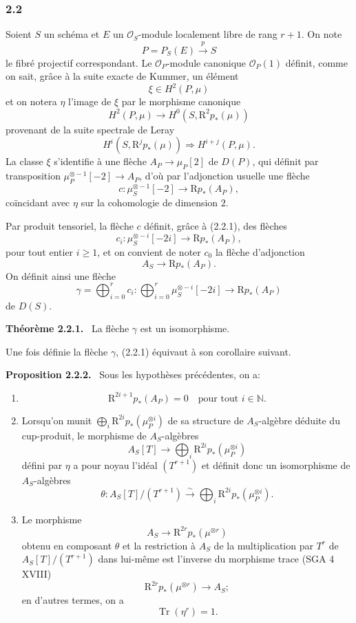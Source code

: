 \documentclass[11pt]{article}
\newenvironment{statement}[1]{\par\medskip\noindent\textbf{#1.}\ }{\par\medskip}
\newcommand{\R}{\mathrm{R}}\newcommand{\RHomCore}{\mathrm{RHom}}
\providecommand{\R}{\mathrm R}
\begin{document}
\subsubsection*{2.2}
Soient $S$ un schéma et $E$ un $\mathcal O_S$-module localement libre de rang $r+1$. On note
\[
P=P_S(E)\xrightarrow{p}S
\]
le fibré projectif correspondant. Le $\mathcal O_P$-module canonique $\mathcal O_P(1)$ définit, comme on sait, grâce à la suite exacte de Kummer, un élément
\[
\xi\in H^2(P,\mu)
\]
et on notera $\eta$ l'image de $\xi$ par le morphisme canonique
\[
H^2(P,\mu)\longrightarrow H^0(S,\R^2p_*(\mu))
\]
provenant de la suite spectrale de Leray
\[
H^i(S,\R^jp_*(\mu))\Rightarrow H^{i+j}(P,\mu).
\]
La classe $\xi$ s'identifie à une flèche $A_P\to\mu_P[2]$ de $D(P)$, qui définit par transposition $\mu_P^{\otimes -1}[-2]\to A_P$, d'où par l'adjonction usuelle une flèche
\[
c:\mu_S^{\otimes -1}[-2]\longrightarrow \R p_*(A_P),
\]
coïncidant avec $\eta$ sur la cohomologie de dimension $2$.

Par produit tensoriel, la flèche $c$ définit, grâce à (2.2.1), des flèches
\[
c_i:\mu_S^{\otimes -i}[-2i]\longrightarrow \R p_*(A_P),
\]
pour tout entier $i\ge1$, et on convient de noter $c_0$ la flèche d'adjonction
\[
A_S\longrightarrow \R p_*(A_P).
\]
On définit ainsi une flèche
\[
\gamma=\bigoplus_{i=0}^{r}c_i:
\bigoplus_{i=0}^{r}\mu_S^{\otimes -i}[-2i]\longrightarrow \R p_*(A_P)
\]
de $D(S)$.

\begin{statement}{Théorème 2.2.1}
La flèche $\gamma$ est un isomorphisme.
\end{statement}

Une fois définie la flèche $\gamma$, (2.2.1) équivaut à son corollaire suivant.

\begin{statement}{Proposition 2.2.2}
Sous les hypothèses précédentes, on a:
\begin{enumerate}[label=\alph*)]
\item
\[
\R^{2i+1}p_*(A_P)=0\quad\text{pour tout }i\in\mathbb N.
\]
\item Lorsqu'on munit $\bigoplus_i \R^{2i}p_*(\mu_P^{\otimes i})$ de sa structure de $A_S$-algèbre déduite du cup-produit, le morphisme de $A_S$-algèbres
\[
A_S[T]\longrightarrow \bigoplus_i \R^{2i}p_*(\mu_P^{\otimes i})
\]
défini par $\eta$ a pour noyau l'idéal $(T^{r+1})$ et définit donc un isomorphisme de $A_S$-algèbres
\[
\theta:A_S[T]/(T^{r+1})\xrightarrow{\sim}\bigoplus_i \R^{2i}p_*(\mu_P^{\otimes i}).
\]
\item Le morphisme
\[
A_S\longrightarrow \R^{2r}p_*(\mu^{\otimes r})
\]
obtenu en composant $\theta$ et la restriction à $A_S$ de la multiplication par $T^r$ de $A_S[T]/(T^{r+1})$ dans lui-même est l'inverse du morphisme trace (SGA 4 XVIII)
\[
\R^{2r}p_*(\mu^{\otimes r})\longrightarrow A_S;
\]
en d'autres termes, on a
\[
\operatorname{Tr}(\eta^r)=1.
\]
\end{enumerate}
\end{statement}
\end{document}
